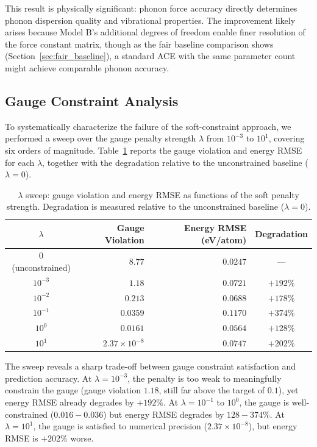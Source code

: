 \documentclass[twoside,prb,aps,floatfix,superscriptaddress,longbibliography]{revtex4-2}
\begin{document}
This result is physically significant: phonon force accuracy directly determines phonon dispersion quality and vibrational properties. The improvement likely arises because Model B's additional degrees of freedom enable finer resolution of the force constant matrix, though as the fair baseline comparison shows (Section~\ref{sec:fair_baseline}), a standard ACE with the same parameter count might achieve comparable phonon accuracy.

\subsection{Gauge Constraint Analysis}
\label{sec:gauge_analysis}

To systematically characterize the failure of the soft-constraint approach, we performed a sweep over the gauge penalty strength $\lambda$ from $10^{-3}$ to $10^1$, covering six orders of magnitude. Table~\ref{tab:lambda_sweep} reports the gauge violation and energy RMSE for each $\lambda$, together with the degradation relative to the unconstrained baseline ($\lambda = 0$).

\begin{table}[t]
\caption{$\lambda$ sweep: gauge violation and energy RMSE as functions of the soft penalty strength. Degradation is measured relative to the unconstrained baseline ($\lambda = 0$).}
\label{tab:lambda_sweep}
\begin{ruledtabular}
\begin{tabular}{crrc}
\toprule
$\lambda$ & Gauge Violation & Energy RMSE (eV/atom) & Degradation \\
\midrule
$0$ (unconstrained) & $8.77$ & $0.0247$ & --- \\
$10^{-3}$ & $1.18$ & $0.0721$ & $+192\%$ \\
$10^{-2}$ & $0.213$ & $0.0688$ & $+178\%$ \\
$10^{-1}$ & $0.0359$ & $0.1170$ & $+374\%$ \\
$10^{0}$ & $0.0161$ & $0.0564$ & $+128\%$ \\
$10^{1}$ & $2.37\times10^{-8}$ & $0.0747$ & $+202\%$ \\
\bottomrule
\end{tabular}
\end{ruledtabular}
\end{table}

The sweep reveals a sharp trade-off between gauge constraint satisfaction and prediction accuracy. At $\lambda = 10^{-3}$, the penalty is too weak to meaningfully constrain the gauge (gauge violation $1.18$, still far above the target of $0.1$), yet energy RMSE already degrades by $+192\%$. At $\lambda = 10^{-1}$ to $10^0$, the gauge is well-constrained ($0.016{-}0.036$) but energy RMSE degrades by $128{-}374\%$. At $\lambda = 10^1$, the gauge is satisfied to numerical precision ($2.37\times10^{-8}$), but energy RMSE is $+202\%$ worse.
\end{document}

